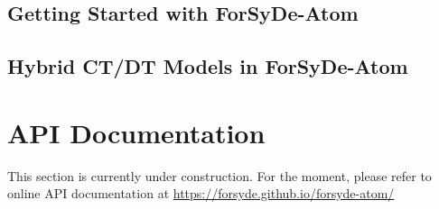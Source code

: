 \documentclass{book}
\newcommand*{\RootPath}{./}%
\begin{document}
\begin{refsection}
\chapter{Getting Started with {{\sc ForSyDe-Atom}}}
\label{ch:getting-started}
\renewcommand*{\RootPath}{../../getting-started/docs/latex}%
\graphicspath{{../../getting-started/docs/latex/figs/}}

\begin{summary}

\end{summary}
\minitoc
\vspace{1ex}














\printbibliography[heading=subbibliography]
\end{refsection}

\begin{refsection}
\chapter{Hybrid CT/DT Models in {{\sc ForSyDe-Atom}}}
\label{ch:hybrid}
\renewcommand*{\RootPath}{../../hybrid/docs/latex}%
\graphicspath{{../../hybrid/docs/latex/figs/}}

\begin{summary}

\end{summary}
\minitoc
\vspace{1ex}





\printbibliography[heading=subbibliography]
\end{refsection}

\part{API Documentation}
\label{part:api-documentation}

\begin{summary}
  This section is currently under construction. For the moment, please refer to online API documentation at \url{https://forsyde.github.io/forsyde-atom/}
\end{summary}
\end{document}
